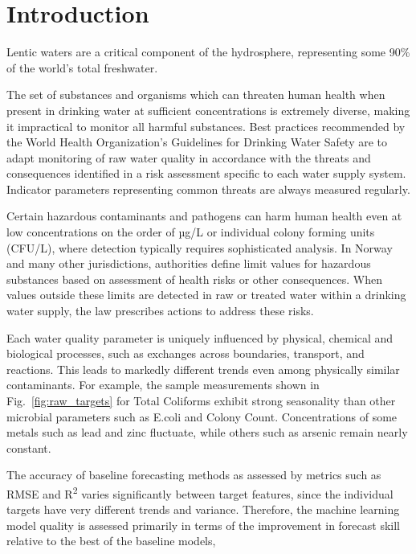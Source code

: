 \documentclass[resources,article,submit,pdftex,moreauthors]{Definitions/mdpi}
\begin{document}
\section{Introduction}
\label{ch:Introduction}

Lentic waters are a critical component of the hydrosphere, representing some 90\% of the world's total freshwater. 


The set of substances and organisms which can threaten human health when present in drinking water at sufficient concentrations is extremely diverse, making it impractical to monitor all harmful substances. Best practices recommended by the World Health Organization's Guidelines for Drinking Water Safety \citep{WHOGuidelines} are to adapt monitoring of raw water quality in accordance with the threats and consequences identified in a risk assessment specific to each water supply system. Indicator parameters representing common threats are always measured regularly. 

Certain hazardous contaminants and pathogens can harm human health even at low concentrations on the order of µg/L or individual colony forming units (CFU/L), where detection typically requires sophisticated analysis. In Norway and many other jurisdictions, authorities define limit values for hazardous substances based on assessment of health risks or other consequences. When values outside these limits are detected in raw or treated water within a drinking water supply, the law prescribes actions to address these risks. 

Each water quality parameter is uniquely influenced by physical, chemical and biological processes, such as exchanges across boundaries, transport, and reactions. This leads to markedly different trends even among physically similar contaminants. For example, the sample measurements shown in Fig.~\ref{fig:raw_targets} for Total Coliforms exhibit strong seasonality than other microbial parameters such as E.coli and Colony Count. Concentrations of some metals such as lead and zinc fluctuate, while others such as arsenic remain nearly constant. 

The accuracy of baseline forecasting methods as assessed by metrics such as RMSE and R\textsuperscript{2} varies significantly between target features, since the individual targets have very different trends and variance. Therefore, the machine learning model quality is assessed primarily in terms of the improvement in forecast skill relative to the best of the baseline models,
\end{document}
